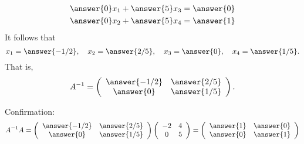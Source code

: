 \documentclass{ximera}
\begin{document}
\begin{exercise}
\begin{enumerate}
\begin{prompt}
\begin{align*}
        \answer{0}x_{1} + \answer{5}x_{3} &= \answer{0}\\
        \answer{0}x_{2} + \answer{5}x_{4} &= \answer{1}
      \end{align*}
      It follows that
      \begin{equation*}
        x_{1} = \answer{-1/2}, \quad
        x_{2} = \answer{2/5}, \quad
        x_{3} = \answer{0}, \quad
        x_{4} = \answer{1/5}.
      \end{equation*}
      That is,
      \[
        A^{-1} = \left(
          \begin{array}{cc}
            \answer{-1/2} & \answer{2/5}\\
            \answer{0} & \answer{1/5}
          \end{array}
        \right).
      \]

      Confirmation:
      \[
        A^{-1}A = \left(
          \begin{array}{cc}
            \answer{-1/2} & \answer{2/5}\\
            \answer{0} & \answer{1/5}
          \end{array}
        \right)\left(
          \begin{array}{cc}
            -2 & 4\\
            0& 5
          \end{array}
        \right)= \left(
          \begin{array}{cc}
            \answer{1} & \answer{0}\\
            \answer{0} & \answer{1}
          \end{array}
        \right)
      \]
    \end{prompt}
  \end{enumerate}
\end{exercise}
\end{document}
